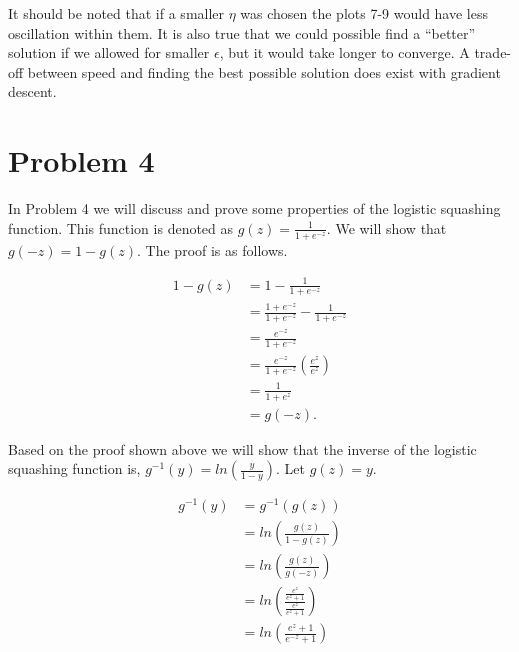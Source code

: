 \documentclass[paper=a4, fontsize=11pt]{scrartcl} %
\begin{document}
It should be noted that if a smaller $\eta$ was chosen the plots 7-9 would have less oscillation within them.
It is also true that we could possible find a ``better'' solution if we allowed for smaller $\epsilon$, but it would take longer to converge.
A trade-off between speed and finding the best possible solution does exist with gradient descent.

\section{Problem 4}

In Problem 4 we will discuss and prove some properties of the logistic squashing function.
This function is denoted as $g(z) = \frac{1}{1 + e^{-z}}$.  We will show that $g(-z) = 1 - g(z)$.  The proof is as follows.

\begin{align*}
1-g(z) &= 1- \frac{1}{1 + e^{-z}} \\
&= \frac{1 + e^{-z}}{1 + e^{-z}}- \frac{1}{1 + e^{-z}} \\
&= \frac{e^{-z}}{1 + e^{-z}} \\
&= \frac{e^{-z}}{1 + e^{-z}}(\frac{e^{z}}{e^{z}}) \\
&= \frac{1}{1 + e^{z}} \\
&= g(-z).
\end{align*}

Based on the proof shown above we will show that the inverse of the logistic squashing function is, $g^{-1}(y) = ln(\frac{y}{1-y})$.  Let $g(z) = y$.

\begin{align*}
g^{-1}(y) &= g^{-1}(g(z)) \\
&= ln(\frac{g(z)}{1-g(z)}) \\
& = ln(\frac{g(z)}{g(-z)}) \\
&= ln(\frac{\frac{e^{z}}{e^{z}+1}}{\frac{e^{z}}{e^{z}+1}}) \\
& = ln(\frac{e^z + 1}{e^{-z} + 1})
\end{align*}
\end{document}
